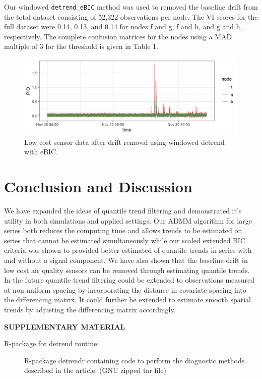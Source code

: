 \documentclass[12pt]{article}
\begin{document}
	Our windowed \texttt{detrend\_eBIC} method was used to removed the baseline drift from the total dataset consisting of 52,322 observations per node. The VI scores for the full dataset were 0.14, 0.13, and 0.14 for nodes f and g, f and h, and g and h, respectively. The complete confusion matrices for the nodes using a MAD multiple of 3 for the threshold is given in Table 1. 
		
	\begin{figure}
		\caption{Low cost sensor data after drift removal using windowed detrend with eBIC.}
		\includegraphics[width = \linewidth]{Figures/corrected_data.png}
	\end{figure}

		
	

	\section{Conclusion and Discussion}
	We have expanded the ideas of quantile trend filtering and demonstrated it's utility in both simulations and applied settings. Our ADMM algorithm for large series both reduces the computing time and allows trends to be estimated on series that cannot be estimated simultaneously while our scaled extended BIC criteria was shown to provided better estimated of quantile trends in series with and without a signal component. We have also shown that the baseline drift in low cost air quality sensors can be removed through estimating quantile trends. 
	In the future quantile trend filtering could be extended to observations measured at non-uniform spacing by incorporating the distance in covariate spacing into the differencing matrix. It could further be extended to estimate smooth spatial trends by adjusting the differencing matrix accordingly. 
	
	\label{sec:conc}
	
	
	\bigskip
	\begin{center}
		{\large\bf SUPPLEMENTARY MATERIAL}
	\end{center}
	
	\begin{description}
		
		\item[R-package for detrend routine:] R-package detrendr containing code to perform the diagnostic methods described in the article. (GNU zipped tar file)
				
	\end{description}
	
	
	
	
	
\end{document}
